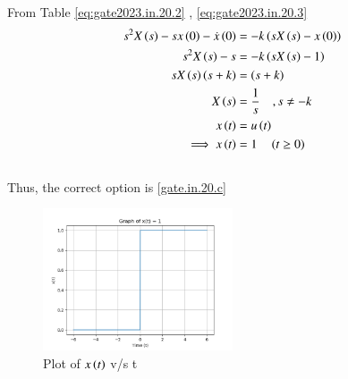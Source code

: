 \documentclass[journal,12pt,twocolumn]{IEEEtran}
\theoremstyle{remark}
\begin{document}
From Table \eqref{eq:gate2023.in.20.2} , \eqref{eq:gate2023.in.20.3} 
\begin{align}
s^2 X\left(s\right) - sx\left(0\right) - \dot{x}\left(0\right) &= -k\left(sX\left(s\right) - x\left(0\right)\right) \\
s^2 X\left(s\right) - s &= -k\left(sX\left(s\right)-1\right) \\
sX\left(s\right)\left(s+k\right)&=\left(s+k\right)\\
     X\left(s\right)&=\frac{1}{s} \quad , s \neq -k \\
     x\left(t\right)&=u\left(t\right)\\
      \implies x\left(t\right)&=1 \quad \left(t\geq 0\right)
\end{align}\\
Thus, the correct option is \ref{gate.in.20.c}
\begin{figure}[h]
    \includegraphics[width=0.5\textwidth]{2023/IN/20/figs/x(t)_vs_t.png}
    \caption{Plot of $x\left(t\right)$ v/s t}
\end{figure}
\end{document}
